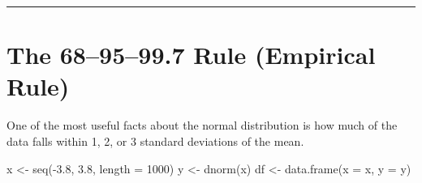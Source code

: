 \documentclass[
  12pt,
  letterpaper,
]{book}
\newenvironment{Shaded}{\begin{snugshade}}{\end{snugshade}}
\newcommand{\AttributeTok}[1]{\textcolor[rgb]{0.40,0.45,0.13}{#1}}
\newcommand{\DecValTok}[1]{\textcolor[rgb]{0.68,0.00,0.00}{#1}}
\newcommand{\FloatTok}[1]{\textcolor[rgb]{0.68,0.00,0.00}{#1}}
\newcommand{\FunctionTok}[1]{\textcolor[rgb]{0.28,0.35,0.67}{#1}}
\newcommand{\NormalTok}[1]{\textcolor[rgb]{0.00,0.23,0.31}{#1}}
\newcommand{\OtherTok}[1]{\textcolor[rgb]{0.00,0.23,0.31}{#1}}
\newcommand{\SpecialCharTok}[1]{\textcolor[rgb]{0.37,0.37,0.37}{#1}}
\begin{document}
\begin{center}\rule{0.5\linewidth}{0.5pt}\end{center}

\section{The 68--95--99.7 Rule (Empirical
Rule)}\label{the-689599.7-rule-empirical-rule}

One of the most useful facts about the normal distribution is how much
of the data falls within 1, 2, or 3 standard deviations of the mean.

\begin{Shaded}
\begin{Highlighting}[]
\NormalTok{x }\OtherTok{\textless{}{-}} \FunctionTok{seq}\NormalTok{(}\SpecialCharTok{{-}}\FloatTok{3.8}\NormalTok{, }\FloatTok{3.8}\NormalTok{, }\AttributeTok{length =} \DecValTok{1000}\NormalTok{)}
\NormalTok{y }\OtherTok{\textless{}{-}} \FunctionTok{dnorm}\NormalTok{(x)}
\NormalTok{df }\OtherTok{\textless{}{-}} \FunctionTok{data.frame}\NormalTok{(}\AttributeTok{x =}\NormalTok{ x, }\AttributeTok{y =}\NormalTok{ y)}


\end{Highlighting}
\end{Shaded}
\end{document}
